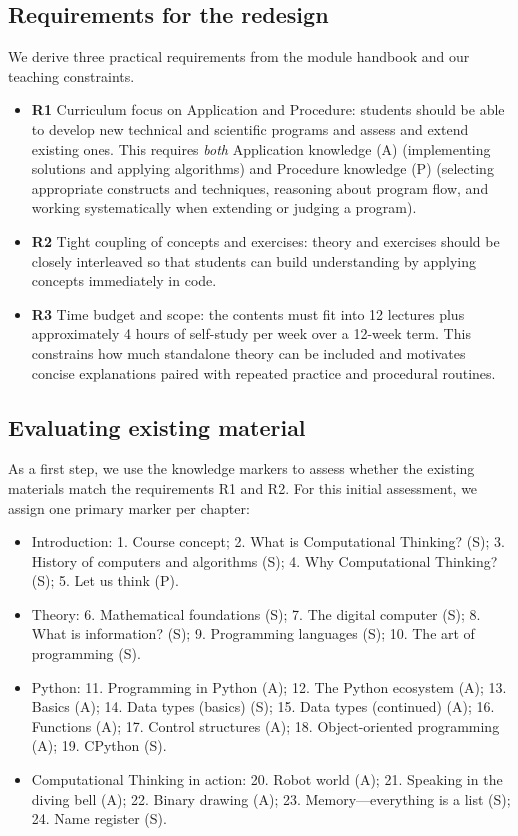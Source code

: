 \documentclass{article}
\begin{document}
\subsection{Requirements for the redesign}
We derive three practical requirements from the module handbook and our teaching constraints.\par
\begin{itemize}[leftmargin=*]
  \item \textbf{R1} Curriculum focus on Application and Procedure: students should be able to develop new technical and scientific programs and assess and extend existing ones. This requires \emph{both} Application knowledge (A) (implementing solutions and applying algorithms) and Procedure knowledge (P) (selecting appropriate constructs and techniques, reasoning about program flow, and working systematically when extending or judging a program).
  \item \textbf{R2} Tight coupling of concepts and exercises: theory and exercises should be closely interleaved so that students can build understanding by applying concepts immediately in code.
  \item \textbf{R3} Time budget and scope: the contents must fit into 12 lectures plus approximately 4 hours of self-study per week over a 12-week term. This constrains how much standalone theory can be included and motivates concise explanations paired with repeated practice and procedural routines.
\end{itemize}


\subsection{Evaluating existing material}
As a first step, we use the knowledge markers to assess whether the existing materials \citep{ZoennchenCTBook} match the requirements R1 and R2. For this initial assessment, we assign one primary marker per chapter:

\begin{itemize}[leftmargin=*]
  \item Introduction: 1. Course concept; 2. What is Computational Thinking? (S); 3. History of computers and algorithms (S); 4. Why Computational Thinking? (S); 5. Let us think (P).
  \item Theory: 6. Mathematical foundations (S); 7. The digital computer (S); 8. What is information? (S); 9. Programming languages (S); 10. The art of programming (S).
  \item Python: 11. Programming in Python (A); 12. The Python ecosystem (A); 13. Basics (A); 14. Data types (basics) (S); 15. Data types (continued) (A); 16. Functions (A); 17. Control structures (A); 18. Object-oriented programming (A); 19. CPython (S).
  \item Computational Thinking in action: 20. Robot world (A); 21. Speaking in the diving bell (A); 22. Binary drawing (A); 23. Memory---everything is a list (S); 24. Name register (S).
\end{itemize}
\end{document}
